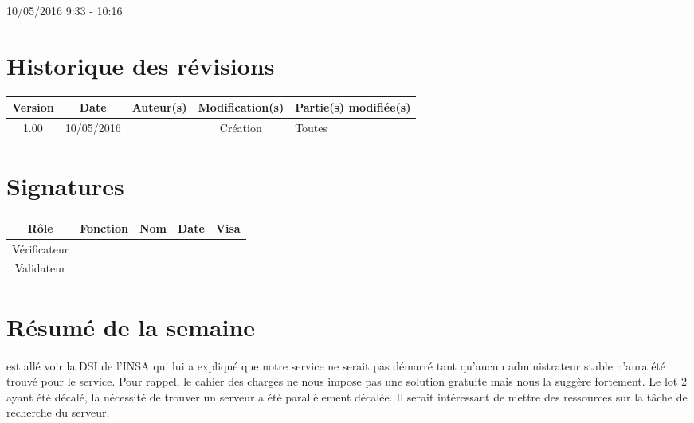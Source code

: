 \documentclass [a4paper] {article}
\begin{document}
\rhead{}

10/05/2016
\hfill   
\hfill 	9:33 - 10:16 				%



\section*{Historique des révisions}
\begin{center}
			\begin{tabular}{| c | c | c | c | p{4cm} |}
				\hline
				\rowcolor{Gray}
				Version & Date & Auteur(s) & Modification(s) & Partie(s) modifiée(s)		 \\
				\hline
				1.00 & 10/05/2016 & \Pierre & Création & Toutes \\
		\hline		
			\end{tabular}
		\end{center}

\section*{Signatures}

		\begin{center}
			\begin{tabular}{| c | c | c | c | p{4cm} |}
				\hline
				\rowcolor{Gray}
				Rôle & Fonction & Nom & Date & Visa		 \\
				\hline
				Vérificateur & \RQA & \Kafui & &  \\[30pt]
				\hline
				Validateur & \CP & \Sergi &  &  \\[30pt]	
				\hline
			\end{tabular}
		\end{center}


\section{Résumé de la semaine}
\paragraph*{}
\Sergi{} est allé voir la DSI de l'INSA qui lui a expliqué que notre service ne serait pas démarré tant qu'aucun administrateur stable n'aura été trouvé pour le service. Pour rappel, le cahier des charges ne nous impose pas une solution gratuite mais nous la suggère fortement. Le lot 2 ayant été décalé, la nécessité de trouver un serveur a été parallèlement décalée. Il serait intéressant de mettre des ressources sur la tâche de recherche du serveur.
\end{document}
